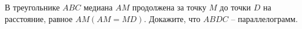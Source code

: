 \begin{ex}
	\begin{condition}
		В треугольнике \( ABC  \) медиана \( AM  \) продолжена за точку \( M  \) до точки \( D  \) на расстояние, равное \( AM (AM = MD) \). Докажите, что \( ABDC \) – параллелограмм.
	\end{condition}
\end{ex}